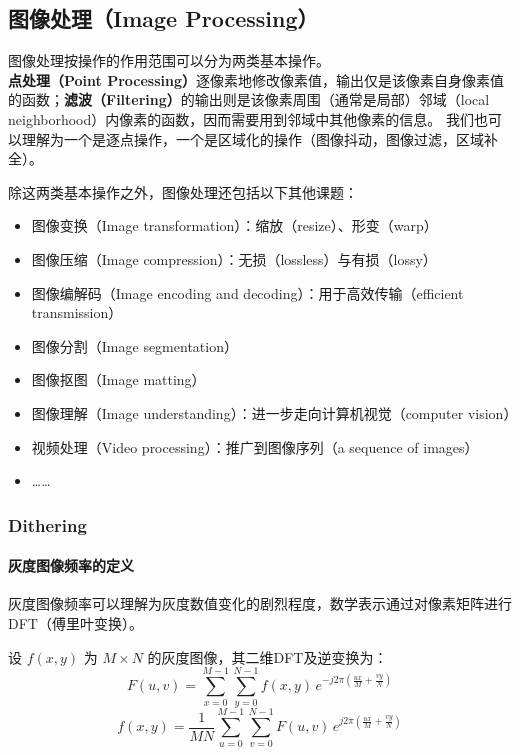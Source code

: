 \subsection{图像处理（Image Processing）}

图像处理按操作的作用范围可以分为两类基本操作。\textbf{点处理（Point Processing）}逐像素地修改像素值，输出仅是该像素自身像素值的函数；\textbf{滤波（Filtering）}的输出则是该像素周围（通常是局部）邻域（local neighborhood）内像素的函数，因而需要用到邻域中其他像素的信息。
我们也可以理解为一个是逐点操作，一个是区域化的操作（图像抖动，图像过滤，区域补全）。

除这两类基本操作之外，图像处理还包括以下其他课题：

\begin{itemize}
    \item 图像变换（Image transformation）：缩放（resize）、形变（warp）
    \item 图像压缩（Image compression）：无损（lossless）与有损（lossy）
    \item 图像编解码（Image encoding and decoding）：用于高效传输（efficient transmission）
    \item 图像分割（Image segmentation）
    \item 图像抠图（Image matting）
    \item 图像理解（Image understanding）：进一步走向计算机视觉（computer vision）
    \item 视频处理（Video processing）：推广到图像序列（a sequence of images）
    \item ……
\end{itemize}

\subsubsection{Dithering}

\paragraph{灰度图像频率的定义}

灰度图像频率可以理解为灰度数值变化的剧烈程度，数学表示通过对像素矩阵进行DFT（傅里叶变换）。

设 $f(x,y)$ 为 $M \times N$ 的灰度图像，其二维DFT及逆变换为：
\[
F(u,v) = \sum_{x=0}^{M-1}\sum_{y=0}^{N-1} f(x,y)\, e^{-j 2\pi \left(\frac{ux}{M} + \frac{vy}{N}\right)}
\]
\[
f(x,y) = \frac{1}{MN}\sum_{u=0}^{M-1}\sum_{v=0}^{N-1} F(u,v)\, e^{j 2\pi \left(\frac{ux}{M} + \frac{vy}{N}\right)}
\]

